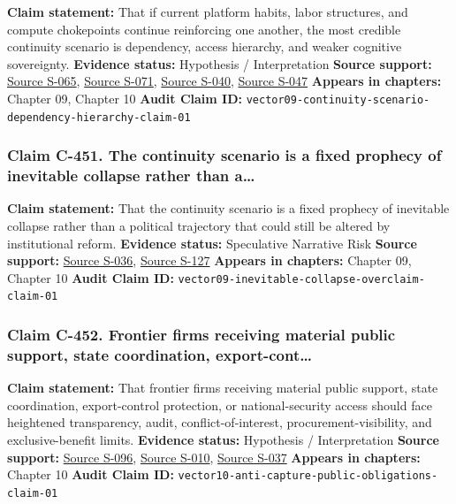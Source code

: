 \documentclass[
  american,
  11pt,
  letterpaper,
]{article}
\begin{document}
\textbf{Claim statement:} That if current platform habits, labor
structures, and compute chokepoints continue reinforcing one another,
the most credible continuity scenario is dependency, access hierarchy,
and weaker cognitive sovereignty. \textbf{Evidence status:} Hypothesis /
Interpretation \textbf{Source support:}
\hyperref[source-s-065-gpts-are-gpts-an-early-look-at-the-labor-market-impact-potential-of-large-language-models]{Source
S-065},
\hyperref[source-s-071-gen-ai-artificial-intelligence-and-the-future-of-work]{Source
S-071},
\hyperref[source-s-040-computing-power-and-the-governance-of-artificial-intelligence]{Source
S-040}, \hyperref[source-s-047-the-adolescence-of-technology]{Source
S-047} \textbf{Appears in chapters:} Chapter 09, Chapter 10
\textbf{Audit Claim ID:}
\texttt{vector09-continuity-scenario-dependency-hierarchy-claim-01}

\subsubsection{Claim C-451. The continuity scenario is a fixed prophecy
of inevitable collapse rather than
a\ldots{}}\label{claim-c-451-the-continuity-scenario-is-a-fixed-prophecy-of-inevitable-collapse-rather-than-a}

\textbf{Claim statement:} That the continuity scenario is a fixed
prophecy of inevitable collapse rather than a political trajectory that
could still be altered by institutional reform. \textbf{Evidence
status:} Speculative Narrative Risk \textbf{Source support:}
\hyperref[source-s-036-annual-economic-report-2026]{Source S-036},
\hyperref[source-s-127-encyclical-letter-of-his-holiness-leo-xiv-magnifica-humanitas]{Source
S-127} \textbf{Appears in chapters:} Chapter 09, Chapter 10
\textbf{Audit Claim ID:}
\texttt{vector09-inevitable-collapse-overclaim-claim-01}

\subsubsection{Claim C-452. Frontier firms receiving material public
support, state coordination,
export-cont\ldots{}}\label{claim-c-452-frontier-firms-receiving-material-public-support-state-coordination-export-cont}

\textbf{Claim statement:} That frontier firms receiving material public
support, state coordination, export-control protection, or
national-security access should face heightened transparency, audit,
conflict-of-interest, procurement-visibility, and exclusive-benefit
limits. \textbf{Evidence status:} Hypothesis / Interpretation
\textbf{Source support:}
\hyperref[source-s-096-openais-proposals-for-the-us-ai-action-plan]{Source
S-096},
\hyperref[source-s-010-ftc-opens-inquiry-into-big-tech-s-partnerships-with-leading-ai-startups]{Source
S-010},
\hyperref[source-s-037-guidance-regarding-enforcement-of-license-requirements-for-advanced-computing-items-for-entities-headquartered-in-country-group-d-5-and-macau]{Source
S-037} \textbf{Appears in chapters:} Chapter 10 \textbf{Audit Claim ID:}
\texttt{vector10-anti-capture-public-obligations-claim-01}
\end{document}
